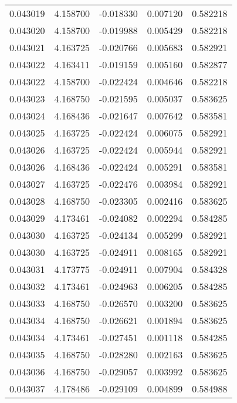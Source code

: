 \begin{tabular}{lrrrr}
0.043019    &  4.158700 & -0.018330 &  0.007120 &             0.582218 \\
0.043020    &  4.158700 & -0.019988 &  0.005429 &             0.582218 \\
0.043021    &  4.163725 & -0.020766 &  0.005683 &             0.582921 \\
0.043022    &  4.163411 & -0.019159 &  0.005160 &             0.582877 \\
0.043022    &  4.158700 & -0.022424 &  0.004646 &             0.582218 \\
0.043023    &  4.168750 & -0.021595 &  0.005037 &             0.583625 \\
0.043024    &  4.168436 & -0.021647 &  0.007642 &             0.583581 \\
0.043025    &  4.163725 & -0.022424 &  0.006075 &             0.582921 \\
0.043026    &  4.163725 & -0.022424 &  0.005944 &             0.582921 \\
0.043026    &  4.168436 & -0.022424 &  0.005291 &             0.583581 \\
0.043027    &  4.163725 & -0.022476 &  0.003984 &             0.582921 \\
0.043028    &  4.168750 & -0.023305 &  0.002416 &             0.583625 \\
0.043029    &  4.173461 & -0.024082 &  0.002294 &             0.584285 \\
0.043030    &  4.163725 & -0.024134 &  0.005299 &             0.582921 \\
0.043030    &  4.163725 & -0.024911 &  0.008165 &             0.582921 \\
0.043031    &  4.173775 & -0.024911 &  0.007904 &             0.584328 \\
0.043032    &  4.173461 & -0.024963 &  0.006205 &             0.584285 \\
0.043033    &  4.168750 & -0.026570 &  0.003200 &             0.583625 \\
0.043034    &  4.168750 & -0.026621 &  0.001894 &             0.583625 \\
0.043034    &  4.173461 & -0.027451 &  0.001118 &             0.584285 \\
0.043035    &  4.168750 & -0.028280 &  0.002163 &             0.583625 \\
0.043036    &  4.168750 & -0.029057 &  0.003992 &             0.583625 \\
0.043037    &  4.178486 & -0.029109 &  0.004899 &             0.584988 \\

\end{tabular}
